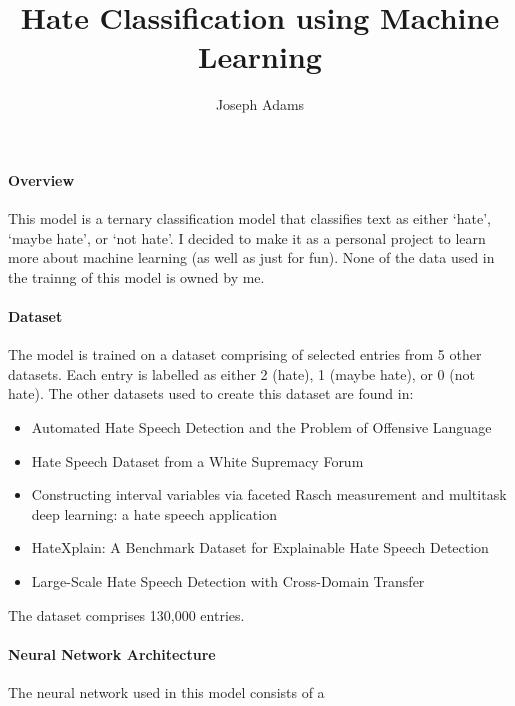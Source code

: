 \documentclass[12pt,a4paper]{article}
\title{Hate Classification using Machine Learning}
\author{Joseph Adams}
\date{}
\begin{document}
\maketitle

\paragraph{Overview} This model is a ternary classification model that classifies text as either `hate', `maybe hate', or `not hate'. I decided to make it as a personal project to learn more about machine learning (as well as just for fun). None of the data used in the trainng of this model is owned by me.

\paragraph{Dataset} The model is trained on a dataset comprising of selected entries from 5 other datasets. Each entry is labelled as either 2 (hate), 1 (maybe hate), or 0 (not hate). The other datasets used to create this dataset are found in:
\begin{itemize}
    \item Automated Hate Speech Detection and the Problem of Offensive Language \cite{hateoffensive}
    \item Hate Speech Dataset from a White Supremacy Forum \cite{gibert2018hate}
    \item Constructing interval variables via faceted Rasch measurement and multitask deep learning: a hate speech application \cite{kennedy2020constructing}
    \item HateXplain: A Benchmark Dataset for Explainable Hate Speech Detection \cite{mathew2021hatexplain}
    \item Large-Scale Hate Speech Detection with Cross-Domain Transfer \cite{toraman2022large}
\end{itemize}
The dataset comprises 130,000 entries.

\paragraph{Neural Network Architecture} The neural network used in this model consists of a

\printbibliography
\end{document}
